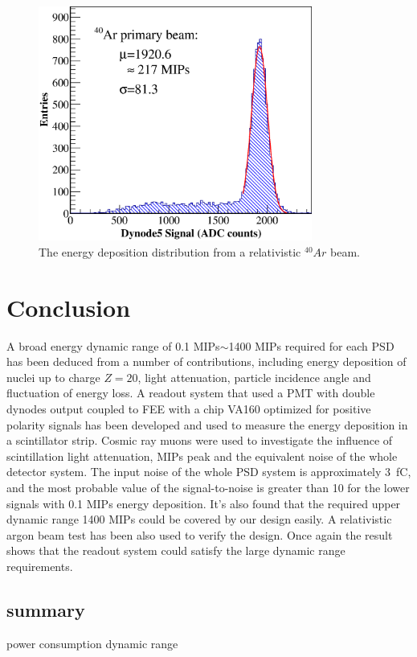 \documentclass[5p, times]{elsarticle}
\begin{document}
\begin{figure}
 \centering
 \includegraphics[width=90mm]{Ar}
\caption{The energy deposition distribution from a relativistic $^{40}Ar$ beam.}
\label{fig:Ar}
\end{figure} 

\section{Conclusion}
\label{sec:conclustion}

A broad energy dynamic range of 0.1 MIPs$\sim$1400 MIPs required for each PSD has been deduced from a number of contributions, including energy deposition of nuclei up to charge $Z=20$, light attenuation, particle incidence angle and fluctuation of energy loss. 
A readout system that used a PMT with double dynodes output coupled to FEE with a chip VA160 optimized for positive polarity signals has been developed and used to measure the energy deposition in a scintillator strip. 
Cosmic ray muons were used to investigate the influence of scintillation light attenuation, MIPs peak and the equivalent noise of the whole detector system. 
The input noise of the whole PSD system is approximately \SI{3}{\femto\coulomb}, and the most probable value of the signal-to-noise is greater than 10 for the lower signals with 0.1 MIPs energy deposition. 
It’s also found that the required upper dynamic range 1400 MIPs could be covered by our design easily. 
A relativistic argon beam test has been also used to verify the design. 
Once again the result shows that the readout system could satisfy the large dynamic range requirements.

\subsection{summary}
power consumption
dynamic range
\end{document}
